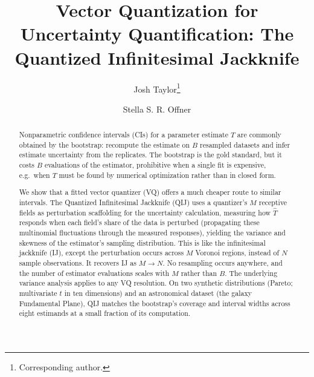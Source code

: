 \documentclass[runningheads]{llncs}
\begin{document}
\title{Vector Quantization for Uncertainty Quantification: The Quantized Infinitesimal Jackknife}

\author{Josh Taylor\thanks{Corresponding author.} \and
Stella S. R. Offner}

\maketitle

\begin{abstract}
Nonparametric confidence intervals (CIs) for a parameter estimate $T$ are commonly obtained by the bootstrap: recompute the estimate on $B$ resampled datasets and infer estimate uncertainty from the replicates. The bootstrap is the gold standard, but it costs $B$ evaluations of the estimator, prohibitive when a single fit is expensive, e.g.\ when $T$ must be found by numerical optimization rather than in closed form. 

We show that a fitted vector quantizer (VQ) offers a much cheaper route to similar intervals. The Quantized Infinitesimal Jackknife (QIJ) uses a
quantizer's $M$ receptive fields as perturbation scaffolding for the
uncertainty calculation, measuring how $\hat{T}$ responds when each field's
share of the data is perturbed (propagating these multinomial fluctuations through the measured responses), yielding the variance and skewness of the estimator's sampling distribution. This is like the infinitesimal jackknife (IJ), except the perturbation occurs across $M$ Voronoi regions, instead of $N$ sample observations. It recovers IJ as $M \to N$. No resampling occurs anywhere, and the number of estimator evaluations scales with $M$ rather than $B$. The underlying variance analysis applies to any VQ resolution. On two synthetic distributions (Pareto; multivariate $t$ in ten dimensions)
and an astronomical dataset (the galaxy Fundamental Plane), QIJ matches the
bootstrap's coverage and interval widths across eight estimands at a small
fraction of its computation.


\end{abstract}
\end{document}
